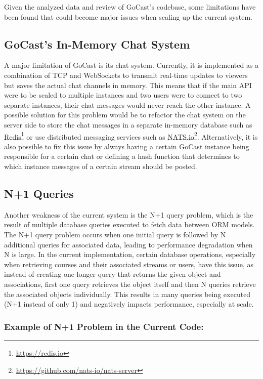 Given the analyzed data and review of GoCast's codebase, some limitations have been found that could become major issues when scaling up the current system.

\subsection{GoCast's In-Memory Chat System}

A major limitation of GoCast is its chat system. Currently, it is implemented as a combination of TCP and WebSockets to transmit real-time updates to viewers but saves the actual chat channels in memory. This means that if the main \ac{API} were to be scaled to multiple instances and two users were to connect to two separate instances, their chat messages would never reach the other instance. A possible solution for this problem would be to refactor the chat system on the server side to store the chat messages in a separate in-memory database such as \href{https://redis.io}{Redis}\footnote{\url{https://redis.io}} or use distributed messaging services such as \href{https://github.com/nats-io/nats-server}{NATS.io}\footnote{\url{https://github.com/nats-io/nats-server}}. Alternatively, it is also possible to fix this issue by always having a certain GoCast instance being responsible for a certain chat or defining a hash function that determines to which instance messages of a certain stream should be posted.

\subsection{N+1 Queries}

Another weakness of the current system is the N+1 query problem, which is the result of multiple database queries executed to fetch data between \ac{ORM} models. The N+1 query problem occurs when one initial query is followed by N additional queries for associated data, leading to performance degradation when N is large. In the current implementation, certain database operations, especially when retrieving courses and their associated streams or users, have this issue, as instead of creating one longer query that returns the given object and associations, first one query retrieves the object itself and then N queries retrieve the associated objects individually. This results in many queries being executed (N+1 instead of only 1) and negatively impacts performance, especially at scale.

\subsubsection{Example of N+1 Problem in the Current Code:}

